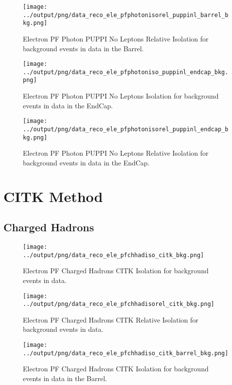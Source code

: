 \documentclass[11pt]{book}
\begin{document}
\begin{figure}[htb]
\centering
\texttt{[image: ../output/png/data\_reco\_ele\_pfphotonisorel\_puppinl\_barrel\_bkg.png]}
\caption{Electron PF Photon PUPPI No Leptons Relative Isolation for background events in data in the Barrel.}
\label{fig:data_ele_pfphotonisorel_puppinl_barrel_bkg}
\end{figure}

\begin{figure}[htb]
\centering
\texttt{[image: ../output/png/data\_reco\_ele\_pfphotoniso\_puppinl\_endcap\_bkg.png]}
\caption{Electron PF Photon PUPPI No Leptons Isolation for background events in data in the EndCap.}
\label{fig:data_ele_pfphotoniso_puppinl_endcap_bkg}
\end{figure}

\begin{figure}[htb]
\centering
\texttt{[image: ../output/png/data\_reco\_ele\_pfphotonisorel\_puppinl\_endcap\_bkg.png]}
\caption{Electron PF Photon PUPPI No Leptons Relative Isolation for background events in data in the EndCap.}
\label{fig:data_ele_pfphotonisorel_puppinl_endcap_bkg}
\end{figure}
\clearpage

\section{CITK Method}
\subsection{Charged Hadrons}
\begin{figure}[htb]
\centering
\texttt{[image: ../output/png/data\_reco\_ele\_pfchhadiso\_citk\_bkg.png]}
\caption{Electron PF Charged Hadrons CITK Isolation for background events in data.}
\label{fig:data_ele_pfchhadiso_citk_bkg}
\end{figure}

\begin{figure}[htb]
\centering
\texttt{[image: ../output/png/data\_reco\_ele\_pfchhadisorel\_citk\_bkg.png]}
\caption{Electron PF Charged Hadrons CITK Relative Isolation for background events in data.}
\label{fig:data_ele_pfchhadisorel_citk_bkg}
\end{figure}

\begin{figure}[htb]
\centering
\texttt{[image: ../output/png/data\_reco\_ele\_pfchhadiso\_citk\_barrel\_bkg.png]}
\caption{Electron PF Charged Hadrons CITK Isolation for background events in data in the Barrel.}
\label{fig:data_ele_pfchhadiso_citk_barrel_bkg}
\end{figure}
\end{document}
